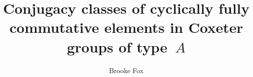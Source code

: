 \title{Conjugacy classes of cyclically fully commutative elements in Coxeter groups of type~$A$}

\author{Brooke Fox}
\def\discipline{Mathematics}
\def\date{May 2014}
\def\chair{Dana C.~Ernst, Ph.D.}
\def\second{Michael Falk, Ph.D.}
\def\third{Stephen Wilson, Ph.D.}

\newtheorem{theorem}{Theorem}[section] 
\newtheorem{lemma}[theorem]{Lemma}
\newtheorem{proposition}[theorem]{Proposition}
\newtheorem{corollary}[theorem]{Corollary}
\newtheorem{conjecture}[theorem]{Conjecture}

\theoremstyle{definition}
\newtheorem{definition}[theorem]{Definition}
\newtheorem{example}[theorem]{Example}
\newtheorem{examples}[theorem]{Examples} 
\newtheorem{problem}[theorem]{Problem} 
\newtheorem{remark}[theorem]{Remark}

\DeclareMathOperator{\C}{\mathrm{C}}
\DeclareMathOperator{\CFC}{\mathrm{CFC}}
\DeclareMathOperator{\supp}{supp}
\DeclareMathOperator{\cyclesupp}{supp_{cycle}}
\DeclareMathOperator{\FC}{FC}
\DeclareMathOperator{\Acyc}{Acyc}

\newcommand{\Z}{\mathbb{Z}}
\newcommand{\N}{\mathbb{N}}
\newcommand{\x}{\mathsf{x}}
\newcommand{\y}{\mathsf{y}}
\newcommand{\w}{\mathsf{w}}
\renewcommand{\u}{\mathsf{u}}
\newcommand{\gen}[1]{\langle #1 \rangle}
\renewcommand{\to}{\longrightarrow}
\renewcommand{\mapsto}{\longmapsto}
\newcommand\scalemath[2]{\scalebox{#1}{\mbox{\ensuremath{\displaystyle #2}}}}
\newcommand{\ds}{\displaystyle}
\providecommand{\abs}[1]{\left\lvert#1\right\rvert}

\makeatletter
\newcommand{\boxbl}[1]{\textcolor{blue}{%
\tikz[baseline={([yshift=-1ex]current bounding box.center)}] \node [rectangle, minimum width=1ex,rounded corners,draw,line width=1.2pt] {\normalcolor\m@th$\displaystyle#1$};}}
\makeatother

\makeatletter
\newcommand{\boxor}[1]{\textcolor{orange}{%
\tikz[baseline={([yshift=-1ex]current bounding box.center)}] \node [rectangle, minimum width=1ex,rounded corners,draw,line width=1.2pt] {\normalcolor\m@th$\displaystyle#1$};}}
\makeatother

\makeatletter
\newcommand{\boxt}[1]{\textcolor{turq}{%
\tikz[baseline={([yshift=-1ex]current bounding box.center)}] \node [rectangle, minimum width=1ex,rounded corners,draw,line width=1.2pt] {\normalcolor\m@th$\displaystyle#1$};}}
\makeatother

\makeatletter
\newcommand{\boxgr}[1]{\textcolor{ggreen}{%
\tikz[baseline={([yshift=-1ex]current bounding box.center)}] \node [rectangle, minimum width=1ex,rounded corners,draw,line width=1.2pt] {\normalcolor\m@th$\displaystyle#1$};}}
\makeatother

